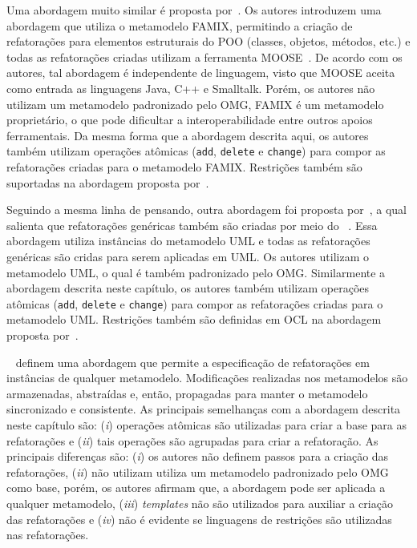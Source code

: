 Uma abordagem muito similar é proposta por~. Os autores introduzem uma abordagem que utiliza o metamodelo FAMIX, permitindo a criação de refatorações para elementos estruturais do POO (classes, objetos, métodos, etc.) e todas as refatorações criadas utilizam a ferramenta MOOSE~\cite{ducasse2005moose}. De acordo com os autores, tal abordagem é independente de linguagem, visto que MOOSE aceita como entrada as linguagens Java, C++ e Smalltalk. Porém, os autores não utilizam um metamodelo padronizado pelo OMG, FAMIX é um metamodelo proprietário, o que pode dificultar a interoperabilidade entre outros apoios ferramentais. Da mesma forma que a abordagem descrita aqui, os autores também utilizam operações atômicas (\texttt{add}, \texttt{delete} e \texttt{change}) para compor as refatorações criadas para o metamodelo FAMIX. Restrições também são suportadas na abordagem proposta por~.  


Seguindo a mesma linha de pensando, outra abordagem foi proposta por~, a qual salienta que refatorações genéricas também são criadas por meio do ~\cite{ledeczi2001generic}. Essa abordagem utiliza instâncias do metamodelo UML e todas as refatorações genéricas são cridas para serem aplicadas em UML. Os autores utilizam o metamodelo UML, o qual é também padronizado pelo OMG. Similarmente a abordagem descrita neste capítulo, os autores também utilizam operações atômicas (\texttt{add}, \texttt{delete} e \texttt{change}) para compor as refatorações criadas para o metamodelo UML. Restrições também são definidas em OCL na abordagem proposta por~.  



~ definem uma abordagem que permite a especificação de refatorações em instâncias de qualquer metamodelo. Modificações realizadas nos metamodelos são armazenadas, abstraídas e, então, propagadas para manter o metamodelo sincronizado e consistente. As principais semelhanças com a abordagem descrita neste capítulo são: (\textit{i}) operações atômicas são utilizadas para criar a base para as refatorações e (\textit{ii}) tais operações são agrupadas para criar a refatoração. As principais diferenças são: (\textit{i}) os autores não definem passos para a criação das refatorações, (\textit{ii}) não utilizam utiliza um metamodelo padronizado pelo OMG como base, porém, os autores afirmam que, a abordagem pode ser aplicada a qualquer metamodelo, (\textit{iii}) \textit{templates} não são utilizados para auxiliar a criação das refatorações e (\textit{iv}) não é evidente se linguagens de restrições são utilizadas nas refatorações. 

